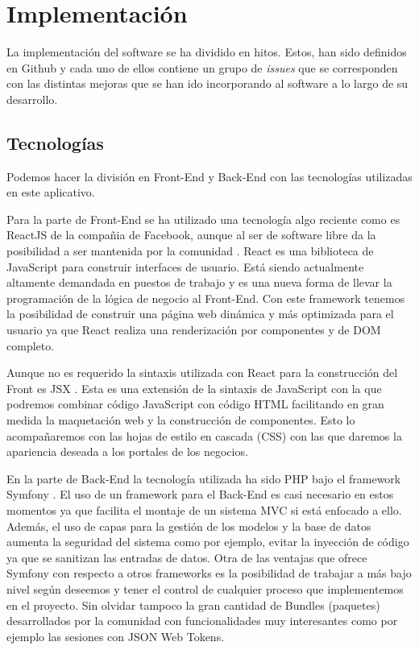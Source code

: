 \chapter{Implementación}

La implementación del software se ha dividido en hitos. Estos, han sido definidos en Github
y cada uno de ellos contiene un grupo de \textit{issues} que se corresponden con las distintas
mejoras que se han ido incorporando al software a lo largo de su desarrollo.\\

\section{Tecnologías}

Podemos hacer la división en Front-End y Back-End con las tecnologías utilizadas en este aplicativo. 

Para la parte de Front-End se ha utilizado una tecnología algo reciente como es ReactJS de la compañia de Facebook, aunque al ser de software libre da la posibilidad a ser mantenida por la comunidad \cite{reactjs}. React es una biblioteca de JavaScript para construir interfaces de usuario. Está siendo actualmente altamente demandada en puestos de trabajo y es una nueva forma de llevar la programación de la lógica de negocio al Front-End. Con este framework tenemos la posibilidad de construir una página web dinámica y más optimizada para el usuario ya que React realiza una renderización por componentes y de DOM completo. 

Aunque no es requerido la sintaxis utilizada con React para la construcción del Front es JSX \cite{jsx}. Esta es una extensión de la sintaxis de JavaScript con la que podremos combinar código JavaScript con código HTML facilitando en gran medida la maquetación web y la construcción de componentes. Esto lo acompañaremos con las hojas de estilo en cascada (CSS) con las que daremos la apariencia deseada a los portales de los negocios.

En la parte de Back-End la tecnología utilizada ha sido PHP bajo el framework Symfony \cite{symfony}. El uso de un framework para el Back-End es casi necesario en estos momentos ya que facilita el montaje de un sistema MVC si está enfocado a ello. Además, el uso de capas para la gestión de los modelos y la base de datos aumenta la seguridad del sistema como por ejemplo, evitar la inyección de código ya que se sanitizan las entradas de datos. Otra de las ventajas que ofrece Symfony con  respecto a otros frameworks es la posibilidad de trabajar a más bajo nivel según deseemos y tener el control de cualquier proceso que implementemos en el proyecto. Sin olvidar tampoco la gran cantidad de Bundles (paquetes) desarrollados por la comunidad con funcionalidades muy interesantes como por ejemplo las sesiones con JSON Web Tokens.

